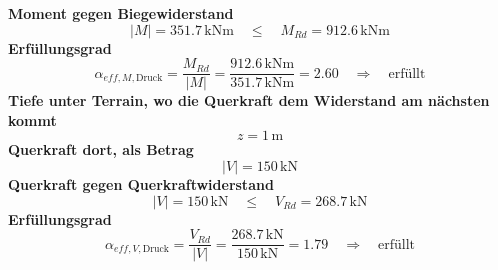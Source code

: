 \documentclass[11pt,a4paper]{article}
\begin{document}
\noindent\textbf{Moment gegen Biegewiderstand}
\begin{equation*}
\left|M\right| = 351.7\,\mathrm{kNm} \quad \le \quad M_{Rd} = 912.6\,\mathrm{kNm}
\end{equation*}
\noindent\textbf{Erfüllungsgrad}
\begin{equation*}
\alpha_{eff,M,\text{Druck}} = \frac{M_{Rd}}{\left|M\right|} = \frac{912.6\,\mathrm{kNm}}{351.7\,\mathrm{kNm}} = 2.60 \quad \Rightarrow \quad \text{erfüllt}
\end{equation*}
\noindent\textbf{Tiefe unter Terrain, wo die Querkraft dem Widerstand am nächsten kommt}
\begin{equation*}
z = 1\,\mathrm{m}
\end{equation*}
\noindent\textbf{Querkraft dort, als Betrag}
\begin{equation*}
\left|V\right| = 150\,\mathrm{kN}
\end{equation*}
\noindent\textbf{Querkraft gegen Querkraftwiderstand}
\begin{equation*}
\left|V\right| = 150\,\mathrm{kN} \quad \le \quad V_{Rd} = 268.7\,\mathrm{kN}
\end{equation*}
\noindent\textbf{Erfüllungsgrad}
\begin{equation*}
\alpha_{eff,V,\text{Druck}} = \frac{V_{Rd}}{\left|V\right|} = \frac{268.7\,\mathrm{kN}}{150\,\mathrm{kN}} = 1.79 \quad \Rightarrow \quad \text{erfüllt}
\end{equation*}
\end{document}
